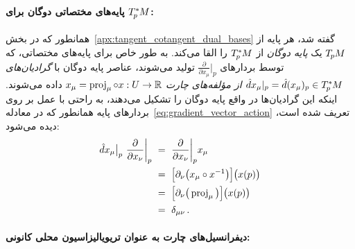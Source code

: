 \paragraph{پایه‌های مختصاتی دوگان برای $T_{\mkern-1.5mu p}^{\mkern-0mu *}\mkern-1muM$:}

همانطور که در بخش~\ref{apx:tangent_cotangent_dual_bases} گفته شد، هر پایه از $T_{\mkern-1.5mu p}\mkern-.5muM$ یک \emph{پایه دوگان} از $T_{\mkern-1.5mu p}^{\mkern-0mu *}\mkern-1muM$ را القا می‌کند.
به طور خاص برای پایه‌های مختصاتی، که توسط بردارهای $\frac{\partial}{\partial x_\mu} \big|_p$ تولید می‌شوند، عناصر پایه دوگان با \emph{گرادیان‌های $\hat{d}x_\mu|_p = \hat{d}(x_\mu)_p \in T_{\mkern-1.5mu p}^{\mkern-0mu *}\mkern-1muM$ از مؤلفه‌های چارت} $x_\mu = \operatorname{proj}_\mu \circ x: U \to \mathbb{R}$ داده می‌شوند.
اینکه این گرادیان‌ها در واقع پایه دوگان را تشکیل می‌دهند، به راحتی با عمل بر روی بردارهای پایه همانطور که در معادله~\eqref{eq:gradient_vector_action} تعریف شده است، دیده می‌شود:
\begin{align}
	\hat{d}x_\mu \big|_p\ \frac{\partial}{\partial x_\nu} \bigg|_p
	\ &=\ \frac{\partial}{\partial x_\nu} \bigg|_p x_\mu \notag \\
	\ &=\ \pig[ \partial_\nu \big( x_\mu \circ x^{-1} \big) \pig] \big(x(p)\big) \notag \\
	\ &=\ \pig[ \partial_\nu \big( \proj_\mu \big) \pig] \big(x(p)\big) \notag \\
	\ &=\ \delta_{\mu\nu} \,.
\end{align}





\paragraph{دیفرانسیل‌های چارت به عنوان تریویالیزاسیون محلی کانونی:}


